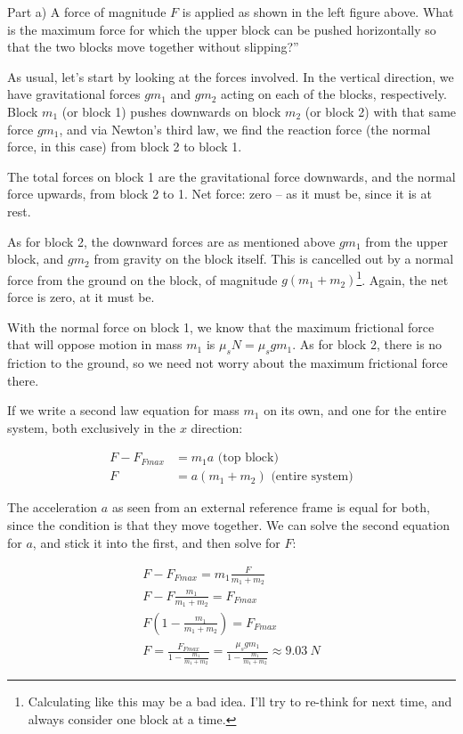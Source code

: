\documentclass[8.01x]{subfiles}
\begin{document}
Part a) A force of magnitude $F$ is applied as shown in the left figure above. What is the maximum force for which the upper block can be pushed horizontally so that the two blocks move together without slipping?''

As usual, let's start by looking at the forces involved. In the vertical direction, we have gravitational forces $g m_1$ and $g m_2$ acting on each of the blocks, respectively.\\
Block $m_1$ (or block 1) pushes downwards on block $m_2$ (or block 2) with that same force $g m_1$, and via Newton's third law, we find the reaction force (the normal force, in this case) from block 2 to block 1.

The total forces on block 1 are the gravitational force downwards, and the normal force upwards, from block 2 to 1. Net force: zero -- as it must be, since it is at rest.

As for block 2, the downward forces are as mentioned above $g m_1$ from the upper block, and $g m_2$ from gravity on the block itself. This is cancelled out by a normal force from the ground on the block, of magnitude $g(m_1 + m_2)$\footnote{Calculating like this may be a bad idea. I'll try to re-think for next time, and always consider one block at a time.}. Again, the net force is zero, at it must be.

With the normal force on block 1, we know that the maximum frictional force that will oppose motion in mass $m_1$ is $\mu_s N = \mu_s g m_1$. As for block 2, there is no friction to the ground, so we need not worry about the maximum frictional force there.

If we write a second law equation for mass $m_1$ on its own, and one for the entire system, both exclusively in the $x$ direction:

\begin{align}
F - F_{Fmax} &= m_1 a \text{ (top block)}\\
F &= a(m_1 + m_2) \text{ (entire system)}
\end{align}

The acceleration $a$ as seen from an external reference frame is equal for both, since the condition is that they move together. We can solve the second equation for $a$, and stick it into the first, and then solve for $F$:

\begin{align}
F - F_{Fmax} = m_1 \frac{F}{m_1 + m_2}\\
F - F \frac{m_1}{m_1 + m_2} = F_{Fmax}\\
F\left(1 - \frac{m_1}{m_1 + m_2}\right) = F_{Fmax}\\
F = \frac{F_{Fmax}}{1 - \frac{m_1}{m_1 + m_2}} = \frac{\mu_s g m_1}{1 - \frac{m_1}{m_1 + m_2}} \approx \SI{9.03}{N}
\end{align}
\end{document}
